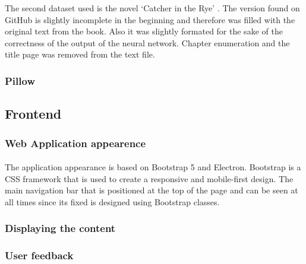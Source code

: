 \documentclass[12pt]{report}
\begin{document}
The second dataset used is the novel `Catcher in the Rye' \citep{catcher_in_the_rye}. The version found on GitHub is
slightly incomplete in the beginning and therefore was filled with the original text from the book. Also it was slightly
formated for the sake of the correctness of the output of the neural network. Chapter enumeration and the title page
was removed from the text file. 


\subsubsection*{Pillow}
\paragraph{}

\subsection*{Frontend}

\subsubsection*{Web Application appearence}
\paragraph{}
The application appearance is based on Bootstrap 5 and Electron. Bootstrap is a CSS framework that is used to create
a responsive and mobile-first design. The main navigation bar that is positioned at the top of the page and can be
seen at all times since its fixed is designed using Bootstrap classes.


\subsubsection*{Displaying the content}
\paragraph{}

\subsubsection*{User feedback}
\end{document}
